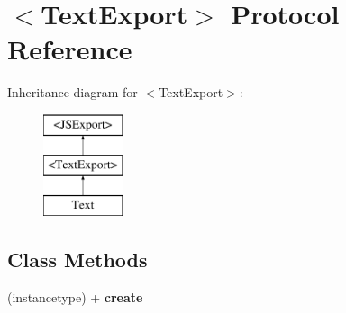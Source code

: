 \hypertarget{protocol_text_export-p}{}\section{$<$Text\+Export$>$ Protocol Reference}
\label{protocol_text_export-p}
Inheritance diagram for $<$Text\+Export$>$\+:\begin{figure}[H]
\begin{center}
\leavevmode
\includegraphics[height=3.000000cm]{protocol_text_export-p}
\end{center}
\end{figure}
\subsection*{Class Methods}
\begin{DoxyCompactItemize}
\item 
\hypertarget{protocol_text_export-p_affd44fab7de3641256eb8f426315a505}{}(instancetype) + {\bfseries create}\label{protocol_text_export-p_affd44fab7de3641256eb8f426315a505}

\end{DoxyCompactItemize}
